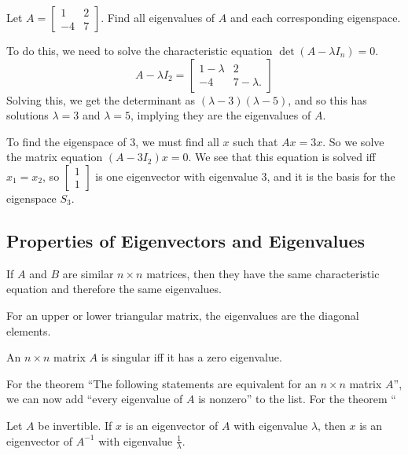 \begin{example}
  Let $A = \begin{bmatrix}
    1 & 2 \\ -4 & 7
  \end{bmatrix}$. Find all eigenvalues of $A$ and each corresponding eigenspace.


  To do this, we need to solve the characteristic equation $\det(A - \lambda I_{n}) = 0$.
  \begin{equation*}
    A - \lambda I_{2} = \begin{bmatrix}
      1 - \lambda & 2 \\ -4 & 7 - \lambda.
    \end{bmatrix}
  \end{equation*}
  Solving this, we get the determinant as $(\lambda - 3) ( \lambda - 5)$, and so this has solutions $\lambda = 3$ and $\lambda = 5$, implying they are the eigenvalues of $A$.

  To find the eigenspace of $3$, we must find all $x$ such that $Ax = 3x$. So we solve the matrix equation $(A - 3 I_{2})x = 0$.
  We see that this equation is solved iff $x_{1} = x_{2}$, so $\begin{bmatrix}
    1 \\ 1
  \end{bmatrix}$ is one eigenvector with eigenvalue $3$, and it is the basis for the eigenspace $S_{3}$.
\end{example}

\subsection{Properties of Eigenvectors and Eigenvalues}
\begin{theorem}
  If $A$ and $B$ are similar $n \times n$ matrices, then they have the same characteristic equation and therefore the same eigenvalues.
\end{theorem}

\begin{theorem}
  For an upper or lower triangular matrix, the eigenvalues are the diagonal elements.
\end{theorem}

\begin{theorem}
  An $n \times n$ matrix $A$ is singular iff it has a zero eigenvalue.
\end{theorem}

For the theorem ``The following statements are equivalent for an $n \times n$ matrix $A$'', we can now add ``every eigenvalue of $A$ is nonzero'' to the list.
For the theorem ``
\begin{theorem}
  Let $A$ be invertible. If $x$ is an eigenvector of $A$ with eigenvalue $\lambda$, then $x$ is an eigenvector of $A^{-1}$ with eigenvalue $\frac{1}{\lambda}$.
\end{theorem}

